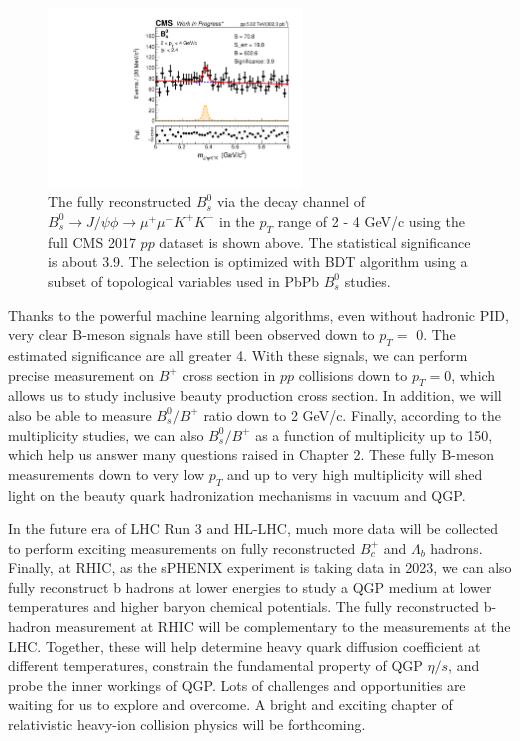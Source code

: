  \begin{figure}[hbtp]
\begin{center}
\includegraphics[width=0.60\textwidth]{Figures/Chapter6/BsLow.pdf}
\caption{The fully reconstructed $B^0_s$ via the decay channel of $B^0_s\rightarrow J/\psi \phi  \rightarrow \mu^+\mu^- K^+ K^-$ in the $p_T$ range of 2 - 4 GeV/c using the full CMS 2017 $pp$ dataset is shown above. The statistical significance is about 3.9. The selection is optimized with BDT algorithm using a subset of topological variables used in PbPb $B^0_s$ studies.}
\label{BsLow}
\end{center}
\end{figure}   

Thanks to the powerful machine learning algorithms, even without hadronic PID, very clear B-meson signals have still been observed down to $p_T =$ 0. The estimated significance are all greater 4. With these signals, we can perform precise measurement on $B^+$ cross section in $pp$ collisions down to $p_T = $0, which allows us to study inclusive beauty production cross section. In addition, we will also be able to measure $B^0_s/B^+$ ratio down to 2 GeV/c. Finally, according to the multiplicity studies, we can also $B^0_s/B^+$ as a function of multiplicity up to 150, which help us answer many questions raised in Chapter 2.  These fully B-meson measurements down to very low $p_T$ and up to very high multiplicity will shed light on the beauty quark hadronization mechanisms in vacuum and QGP.

In the future era of LHC Run 3 and HL-LHC, much more data will be collected to perform exciting measurements on fully reconstructed $B^+_c$ and $\Lambda_b$ hadrons. Finally, at RHIC, as the sPHENIX experiment is taking data in 2023, we can also fully reconstruct b hadrons at lower energies to study a QGP medium at lower temperatures and higher baryon chemical potentials. The fully reconstructed b-hadron measurement at RHIC will be complementary to the measurements at the LHC. Together, these will help determine heavy quark diffusion coefficient at different temperatures, constrain the fundamental property of QGP $\eta/s$, and probe the inner workings of QGP. Lots of challenges and opportunities are waiting for us to explore and overcome. A bright and exciting chapter of relativistic heavy-ion collision physics will be forthcoming.



